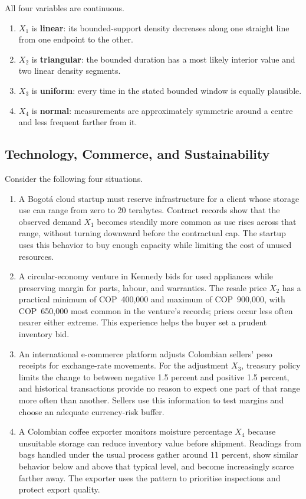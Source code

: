 	All four variables are continuous.
	\begin{enumerate}
		\item $X_1$ is \textbf{linear}: its bounded-support density decreases along one straight line from one endpoint to the other.
		\item $X_2$ is \textbf{triangular}: the bounded duration has a most likely interior value and two linear density segments.
		\item $X_3$ is \textbf{uniform}: every time in the stated bounded window is equally plausible.
		\item $X_4$ is \textbf{normal}: measurements are approximately symmetric around a centre and less frequent farther from it.
	\end{enumerate}


	\subsection{Technology, Commerce, and Sustainability}
	\label{sec:technology-commerce-sustainability}

	Consider the following four situations.

	\begin{enumerate}
		\item A Bogotá cloud startup must reserve infrastructure for a client whose storage use can range from zero to 20 terabytes. Contract records show that the observed demand \(X_1\) becomes steadily more common as use rises across that range, without turning downward before the contractual cap. The startup uses this behavior to buy enough capacity while limiting the cost of unused resources.
		\item A circular-economy venture in Kennedy bids for used appliances while preserving margin for parts, labour, and warranties. The resale price \(X_2\) has a practical minimum of COP~400,000 and maximum of COP~900,000, with COP~650,000 most common in the venture's records; prices occur less often nearer either extreme. This experience helps the buyer set a prudent inventory bid.
		\item An international e-commerce platform adjusts Colombian sellers' peso receipts for exchange-rate movements. For the adjustment \(X_3\), treasury policy limits the change to between negative 1.5 percent and positive 1.5 percent, and historical transactions provide no reason to expect one part of that range more often than another. Sellers use this information to test margins and choose an adequate currency-risk buffer.
		\item A Colombian coffee exporter monitors moisture percentage \(X_4\) because unsuitable storage can reduce inventory value before shipment. Readings from bags handled under the usual process gather around 11 percent, show similar behavior below and above that typical level, and become increasingly scarce farther away. The exporter uses the pattern to prioritise inspections and protect export quality.
	\end{enumerate}

